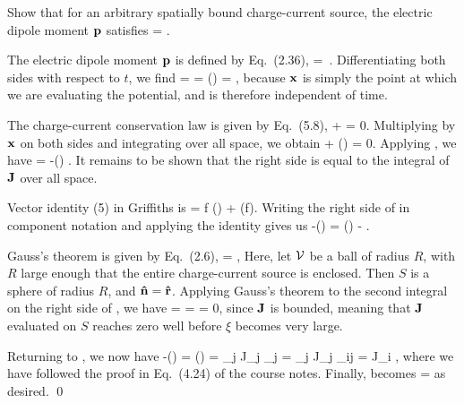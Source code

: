 \begin{statement}{}
	Show that for an arbitrary spatially bound charge-current source, the electric dipole moment $\vb{p}$ satisfies
	\beq
		 = \int \vJ \dcx.
	\eeq
	\vfix
\end{statement}

\begin{solution}
	The electric dipole moment $\vb{p}$ is defined by Eq.~(2.36),
	\beqn \label{dipole}
		\vp = \int \vx \,\rhox \dcx.
	\eeqn
	Differentiating both sides with respect to $t$, we find
	\beqn \label{pder}
		 =  \int \vx \rho \dcx = \int {} (\vx \rho) \dcx
		= \int \vx {} \dcx,
	\eeqn
	because $\vb{x}$ is simply the point at which we are evaluating the potential, and is therefore independent of time.
	
	The charge-current conservation law is given by Eq.~(5.8),
	\beqn \label{continuity}
		 + \div{\vJ} = 0.
	\eeqn
	Multiplying by $\vb{x}$ on both sides and integrating over all space, we obtain
	\beq
		\int \vx {} \dcx + \int \vx (\div{\vJ}) \dcx = 0.
	\eeq
	Applying , we have
	\beqn \label{thing1}
		 = -\int \vx (\div{\vJ}) \dcx.
	\eeqn
	It remains to be shown that the right side is equal to the integral of $\vb{J}$ over all space.
	
	Vector identity (5) in Griffiths is
	\beq
		 = f (\div{\vaa}) + \vaa \vdot (\grad f).
	\eeq
	Writing the right side of  in component notation and applying the identity gives us
	\beqn \label{thing2}
		-\int \xi (\div{\vJ}) \dcx = \int \vJ \vdot (\grad \xi) \dcx - \int \div{(\xi \vJ)} \dcx.
	\eeqn
	
	Gauss's theorem is given by Eq.~(2.6),
	\beq
		\intcV \div{\vv} \dcx = \intS \vv \vdot \nh \dS,
	\eeq
	Here, let $\mathcal{V}$ be a ball of radius $R$, with $R$ large enough that the entire charge-current source is enclosed.  Then $S$ is a sphere of radius $R$, and $\vb{\hat{n}} = \vb{\hat{r}}$.  Applying Gauss's theorem to the second integral on the right side of , we have
	\beq
		\int \div{(\xi \vJ)} \dcx = \limRi \intcV \div{(\xi \vJ)} \dcx
		= \limRi \intS \xi \vJ \vdot \rh \dS
		= 0,
	\eeq
	since $\vb{J}$ is bounded, meaning that $\vb{J}$ evaluated on $S$ reaches zero well before $\xi$ becomes very large.
	
	Returning to , we now have
	\beq
		-\int \xi (\div{\vJ}) \dcx = \int \vJ \vdot (\grad \xi) \dcx
		= \sum_j \int J_j \partial_j \xi \dcx
		= \sum_j \int J_j \del_{ij} \dcx
		= \int J_i \dcx,
	\eeq
	where we have followed the proof in Eq.~(4.24) of the course notes.  Finally,  becomes
	\beq
		 = \int \vJ \dcx
	\eeq
	as desired. \qed
\end{solution}